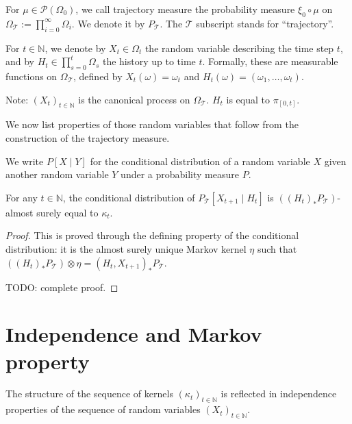 \begin{definition}\label{def:trajMeasure}
  \leanok
For $\mu \in \mathcal{P}(\Omega_0)$, we call trajectory measure the probability measure $\xi_0 \circ \mu$ on $\Omega_{\mathcal{T}} := \prod_{i=0}^{\infty} \Omega_i$.
We denote it by $P_{\mathcal{T}}$.
The $\mathcal{T}$ subscript stands for ``trajectory''.
\end{definition}


\begin{definition}\label{def:history}
  \leanok %
For $t \in \mathbb{N}$, we denote by $X_t \in \Omega_t$ the random variable describing the time step $t$, and by $H_t \in \prod_{s=0}^t \Omega_s$ the history up to time $t$.
Formally, these are measurable functions on $\Omega_{\mathcal{T}}$, defined by $X_t(\omega) = \omega_t$ and $H_t(\omega) = (\omega_1, \ldots, \omega_t)$.
\end{definition}

Note: $(X_t)_{t \in \mathbb{N}}$ is the canonical process on $\Omega_{\mathcal{T}}$. $H_t$ is equal to $\pi_{[0,t]}$.

We now list properties of those random variables that follow from the construction of the trajectory measure.

We write $P[X \mid Y]$ for the conditional distribution of a random variable $X$ given another random variable $Y$ under a probability measure $P$.

\begin{lemma}\label{lem:condDistrib_X_add_one}
  \leanok
For any $t \in \mathbb{N}$, the conditional distribution of $P_{\mathcal{T}}\left[X_{t+1} \mid H_t\right]$ is $((H_t)_* P_{\mathcal{T}})$-almost surely equal to $\kappa_t$.
\end{lemma}

\begin{proof}\leanok
This is proved through the defining property of the conditional distribution: it is the almost surely unique Markov kernel $\eta$ such that $((H_t)_* P_{\mathcal{T}}) \otimes \eta = (H_t, X_{t+1})_*P_{\mathcal{T}}$.

TODO: complete proof.
\end{proof}


\section{Independence and Markov property}

The structure of the sequence of kernels $(\kappa_t)_{t \in \mathbb{N}}$ is reflected in independence properties of the sequence of random variables $(X_t)_{t \in \mathbb{N}}$.
